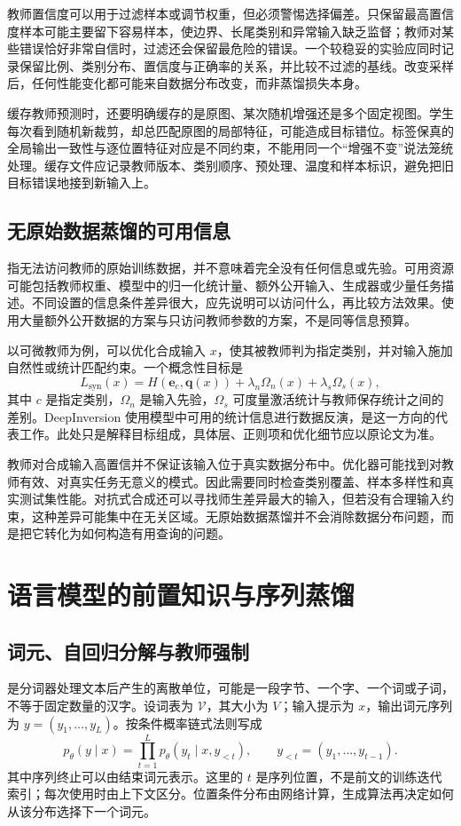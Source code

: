 \documentclass[UTF8,12pt,a4paper,fontset=fandol]{ctexart}
\begin{document}
教师置信度可以用于过滤样本或调节权重，但必须警惕选择偏差。只保留最高置信度样本可能主要留下容易样本，使边界、长尾类别和异常输入缺乏监督；教师对某些错误恰好非常自信时，过滤还会保留最危险的错误。一个较稳妥的实验应同时记录保留比例、类别分布、置信度与正确率的关系，并比较不过滤的基线。改变采样后，任何性能变化都可能来自数据分布改变，而非蒸馏损失本身。

缓存教师预测时，还要明确缓存的是原图、某次随机增强还是多个固定视图。学生每次看到随机新裁剪，却总匹配原图的局部特征，可能造成目标错位。标签保真的全局输出一致性与逐位置特征对应是不同约束，不能用同一个“增强不变”说法笼统处理。缓存文件应记录教师版本、类别顺序、预处理、温度和样本标识，避免把旧目标错误地接到新输入上。

\subsection{无原始数据蒸馏的可用信息}
指无法访问教师的原始训练数据，并不意味着完全没有任何信息或先验。可用资源可能包括教师权重、模型中的归一化统计量、额外公开输入、生成器或少量任务描述。不同设置的信息条件差异很大，应先说明可以访问什么，再比较方法效果。使用大量额外公开数据的方案与只访问教师参数的方案，不是同等信息预算。

以可微教师为例，可以优化合成输入 $x$，使其被教师判为指定类别，并对输入施加自然性或统计匹配约束。一个概念性目标是
\[
 L_{\mathrm{syn}}(x)=H(\mathbf e_c,\mathbf q(x))
 +\lambda_{n}\Omega_{n}(x)+\lambda_{s}\Omega_{s}(x),
\]
其中 $c$ 是指定类别，$\Omega_{n}$ 是输入先验，$\Omega_{s}$ 可度量激活统计与教师保存统计之间的差别。DeepInversion 使用模型中可用的统计信息进行数据反演，是这一方向的代表工作\cite{yin2020}。此处只是解释目标组成，具体层、正则项和优化细节应以原论文为准。

教师对合成输入高置信并不保证该输入位于真实数据分布中。优化器可能找到对教师有效、对真实任务无意义的模式。因此需要同时检查类别覆盖、样本多样性和真实测试集性能。对抗式合成还可以寻找师生差异最大的输入，但若没有合理输入约束，这种差异可能集中在无关区域。无原始数据蒸馏并不会消除数据分布问题，而是把它转化为如何构造有用查询的问题。

\section{语言模型的前置知识与序列蒸馏}
\label{sec:kd-language}

\subsection{词元、自回归分解与教师强制}
是分词器处理文本后产生的离散单位，可能是一段字节、一个字、一个词或子词，不等于固定数量的汉字。设词表为 $\mathcal V$，其大小为 $V$；输入提示为 $x$，输出词元序列为 $y=(y_1,\ldots,y_L)$。按条件概率链式法则写成
\begin{equation}
 p_\theta(y\mid x)=\prod_{t=1}^L p_\theta(y_t\mid x,y_{<t}),
 \qquad y_{<t}=(y_1,\ldots,y_{t-1}).
 \label{eq:kd-autoregressive}
\end{equation}
其中序列终止可以由结束词元表示。这里的 $t$ 是序列位置，不是前文的训练迭代索引；每次使用时由上下文区分。位置条件分布由网络计算，生成算法再决定如何从该分布选择下一个词元。
\end{document}
